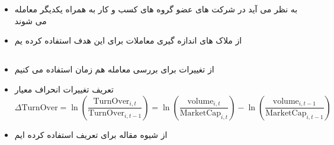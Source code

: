 \documentclass[12pt, a4paper]{article}
\begin{document}
%	
%		
%
%
%	
	





\FloatBarrier

\section{ }
\begin{itemize}
	\item 
	به نظر می آید در شرکت های عضو گروه های کسب و کار به همراه یکدیگر معامله می شوند
	\item
	از ملاک های اندازه گیری معاملات برای این هدف استفاده کرده یم
\end{itemize}
\subsection{}
\begin{itemize}
	\item 
	از تغییرات 
	برای بررسی معامله هم زمان استفاده می کنیم
	\item 
	تعریف تغییرات انحراف معیار
	\begin{equation}
			\Delta \text{TurnOver} = \ln(\frac{\text{TurnOver}_{i,t}}{\text{TurnOver}_{i,t-1}}) = 
		\ln({\frac{\text{volume}_{i,t}}{\text{MarketCap}_{i,t}}}) - \ln({\frac{\text{volume}_{i,t-1}}{\text{MarketCap}_{i,t-1}}})
	\end{equation}
	\item 
	از شیوه مقاله 
	برای تعریف استفاده کرده ایم
\end{itemize}
\end{document}
